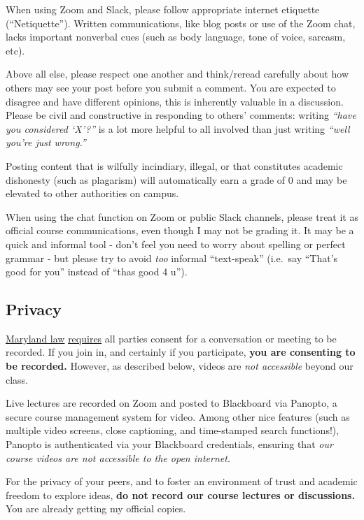 \documentclass{article}
\begin{document}
When using Zoom and Slack, please follow appropriate internet etiquette
(``Netiquette''). Written communications, like blog posts or use of the
Zoom chat, lacks important nonverbal cues (such as body language, tone
of voice, sarcasm, etc).

Above all else, please respect one another and think/reread carefully
about how others may see your post before you submit a comment. You are
expected to disagree and have different opinions, this is inherently
valuable in a discussion. Please be civil and constructive in responding
to others' comments: writing \emph{``have you considered `X'?''} is a
lot more helpful to all involved than just writing \emph{``well you're
just wrong.''}

Posting content that is wilfully incindiary, illegal, or that
constitutes academic dishonesty (such as plagarism) will automatically
earn a grade of 0 and may be elevated to other authorities on campus.

When using the chat function on Zoom or public Slack channels, please
treat it as official course communications, even though I may not be
grading it. It may be a quick and informal tool - don't feel you need to
worry about spelling or perfect grammar - but please try to avoid
\emph{too} informal ``text-speak'' (i.e.~say ``That's good for you''
instead of ``thas good 4 u'').

\hypertarget{privacy}{%
\subsection{Privacy}\label{privacy}}

\href{https://www.execvision.io/blog/maryland-call-recording-laws/}{Maryland
law}
\href{https://law.justia.com/codes/maryland/2005/gcj/10-402.html}{requires}
all parties consent for a conversation or meeting to be recorded. If you
join in, and certainly if you participate, \textbf{you are consenting to
be recorded.} However, as described below, videos are \emph{not
accessible} beyond our class.

Live lectures are recorded on Zoom and posted to Blackboard via Panopto,
a secure course management system for video. Among other nice features
(such as multiple video screens, close captioning, and time-stamped
search functions!), Panopto is authenticated via your Blackboard
credentials, ensuring that \emph{our course videos are not accessible to
the open internet.}

For the privacy of your peers, and to foster an environment of trust and
academic freedom to explore ideas, \textbf{do not record our course
lectures or discussions.} You are already getting my official copies.
\end{document}
